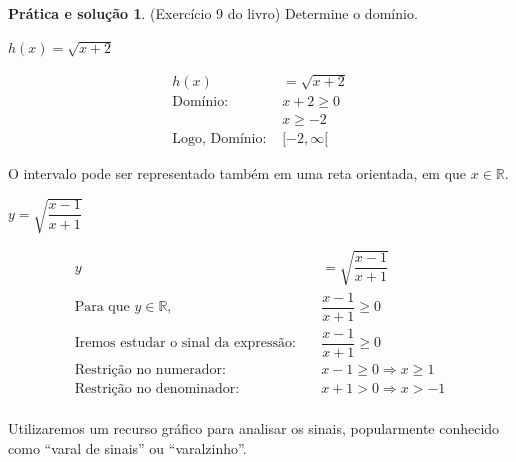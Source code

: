 \documentclass[12pt,openright,twoside,a4paper]{article}
\theoremstyle{definition}
\newtheorem{practice}{Prática e solução}[section]
\begin{document}
	\begin{practice}
		(Exercício 9 do livro) Determine o domínio.
		
		\item[e)] $h(x) = \sqrt{x + 2}$
		
		\begin{align*}
			h(x) &= \sqrt{x + 2} \\
			\text{Domínio: } & x + 2 \geq 0 \\
			& x \geq -2 \\
			\text{Logo, } \text{Domínio: } & [-2, \infty[
		\end{align*}
		
		O intervalo pode ser representado também em uma reta orientada, em que $x \in \mathbb{R}$.
		
		\begin{center}
		\end{center}
		\item[g)] $y = \sqrt{\dfrac{x - 1}{x + 1}}$
		
		\begin{align*}
			y &= \sqrt{\dfrac{x - 1}{x + 1}} \\
			\text{Para que } y \in \mathbb{R},\quad &\dfrac{x - 1}{x + 1} \geq 0 \\
			\text{Iremos estudar o sinal da expressão:} \quad &\dfrac{x - 1}{x + 1} \geq 0 \\
			\text{Restrição no numerador: } &x - 1 \geq 0 \Rightarrow x \geq 1 \\
			\text{Restrição no denominador: } &x + 1 > 0 \Rightarrow x > -1\\
		\end{align*}
		
		Utilizaremos um recurso gráfico para analisar os sinais, popularmente conhecido como ``varal de sinais'' ou ``varalzinho''. 
		

\end{practice}
\end{document}

